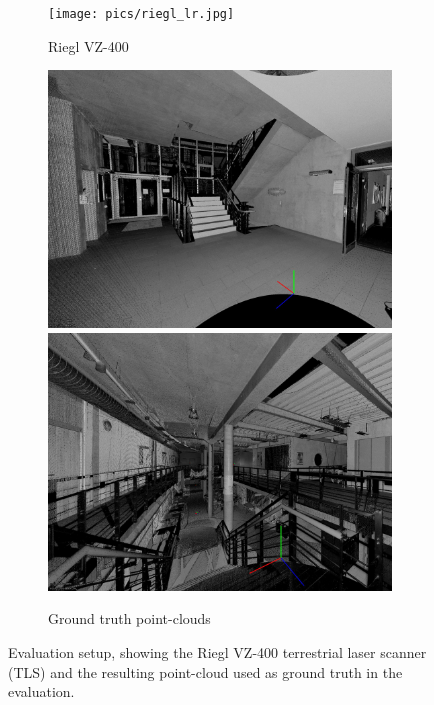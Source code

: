 \documentclass[a4paper, conference]{IEEEtran}
\begin{document}
\begin{figure}[t]
\centering
\begin{subfigure}{0.495\columnwidth}
        \centering
        \texttt{[image: pics/riegl\_lr.jpg]}
        \caption{Riegl VZ-400}
        \label{fig:riegl}
\end{subfigure}
\hfill
\begin{subfigure}{0.49\columnwidth}
        \centering
        \includegraphics[width=\textwidth]{pics/groundtruth1.jpg}\vspace{.5mm}
        \includegraphics[width=\textwidth]{pics/groundtruth2.jpg}
        \caption{Ground truth point-clouds}
        \label{fig:sphere_on_the_move}
\end{subfigure}
\caption{Evaluation setup, showing the Riegl VZ-400 terrestrial laser scanner (TLS) and the resulting point-cloud used as ground truth in the evaluation.}\vspace{-3mm}
\end{figure}
\end{document}
